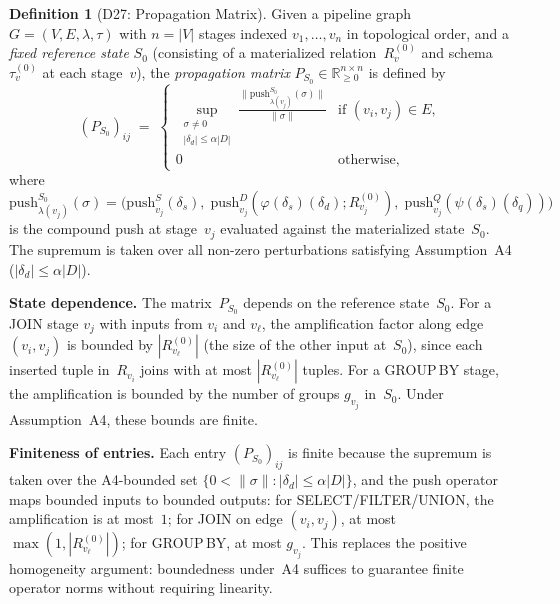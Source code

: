 \documentclass[11pt,a4paper]{article}
\theoremstyle{definition}
\newtheorem{definition}[theorem]{Definition}
\newcommand{\push}{\mathrm{push}}
\newcommand{\propmat}{P}
\newcommand{\propmatS}{\propmat_{S_0}}
\newcommand{\bbR}{\mathbb{R}}
\begin{document}
\begin{definition}[D27: Propagation Matrix]\label{def:prop-matrix}
Given a pipeline graph $G = (V, E, \lambda, \tau)$ with $n = |V|$ stages
indexed $v_1, \ldots, v_n$ in topological order, and a \emph{fixed reference
state} $S_0$ (consisting of a materialized relation~$R_v^{(0)}$ and
schema~$\tau_v^{(0)}$ at each stage~$v$), the \emph{propagation matrix}
$\propmatS \in \bbR_{\geq 0}^{n \times n}$ is defined by
\[
  (\propmatS)_{ij} \;=\;
  \begin{cases}
    \displaystyle
    \sup_{\substack{\sigma \neq 0 \\ |\delta_d| \leq \alpha |D|}}
    \frac{\|\push_{\lambda(v_j)}^{S_0}(\sigma)\|}{\|\sigma\|}
    & \text{if } (v_i, v_j) \in E, \\[8pt]
    0 & \text{otherwise},
  \end{cases}
\]
where $\push_{\lambda(v_j)}^{S_0}(\sigma) =
\bigl(\push_{v_j}^S(\delta_s),\;
      \push_{v_j}^D(\varphi(\delta_s)(\delta_d); R_{v_j}^{(0)}),\;
      \push_{v_j}^Q(\psi(\delta_s)(\delta_q))\bigr)$
is the compound push at stage~$v_j$ evaluated against the materialized
state~$S_0$.  The supremum is taken over all non-zero perturbations satisfying
Assumption~A4 ($|\delta_d| \leq \alpha |D|$).

\medskip\noindent
\textbf{State dependence.}  The matrix~$\propmatS$ depends on the reference
state~$S_0$.  For a JOIN stage $v_j$ with inputs from $v_i$ and $v_\ell$, the
amplification factor along edge $(v_i, v_j)$ is bounded by
$|R_{v_\ell}^{(0)}|$ (the size of the other input at~$S_0$), since each
inserted tuple in~$R_{v_i}$ joins with at most $|R_{v_\ell}^{(0)}|$ tuples.
For a GROUP\,BY stage, the amplification is bounded by the number of groups
$g_{v_j}$ in~$S_0$.  Under Assumption~A4, these bounds are finite.

\medskip\noindent
\textbf{Finiteness of entries.}  Each entry $(\propmatS)_{ij}$ is finite
because the supremum is taken over the A4-bounded set
$\{0 < \|\sigma\| : |\delta_d| \leq \alpha|D|\}$, and the push operator maps
bounded inputs to bounded outputs: for SELECT/FILTER/UNION, the amplification
is at most~$1$; for JOIN on edge $(v_i, v_j)$,
at most $\max(1, |R_{v_\ell}^{(0)}|)$; for GROUP\,BY, at most $g_{v_j}$.
This replaces the positive homogeneity argument: boundedness under~A4 suffices
to guarantee finite operator norms without requiring linearity.
\end{definition}
\end{document}
